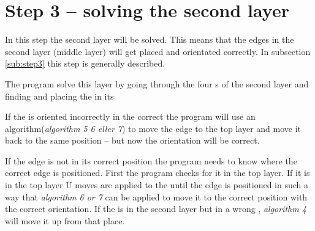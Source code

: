 \section{Step 3 -- solving the second layer}
In this step the second layer will be solved. 
This means that the edges in the second layer (middle layer) will get placed and orientated correctly. 
In subsection \ref{sub:step3} this step is generally described. 

The program solve this layer by going through the four \cubicle{}s of the second layer and finding and placing the \cpiece{} in its \cubicle{}

If the \cpiece is oriented incorrectly in the correct \cubicle{} the program will use an algorithm(\textit{algorithm 5 6 eller 7})  to move the edge \cpiece{} to the top layer and move it back to the same position -- but now the orientation will be correct. 

If the edge \cpiece{} is not in its correct position the program needs to know where the correct edge \cpiece{} is positioned. First the program checks for it in the top layer. 
If it is in the top layer U moves are applied to the \rubik{} until the edge \cpiece{} is positioned in such a way that \textit{algorithm 6 or 7} can be applied to move it to the correct position with the correct orientation. 
If the \cpiece{} is in the second layer but in a wrong \cubicle{}, \textit{algorithm 4} will move it up from that place. 

